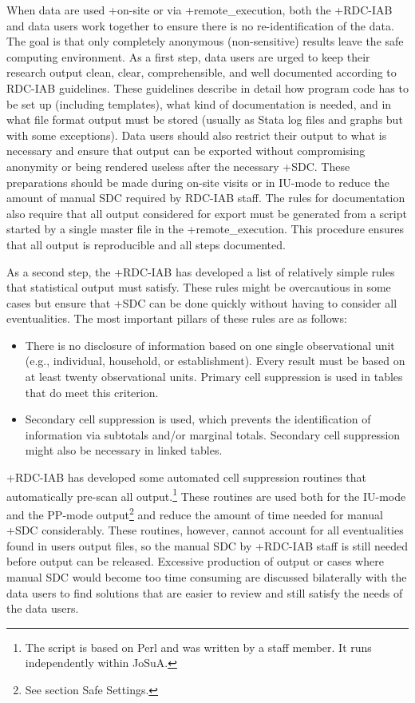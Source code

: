 \documentclass[
]{book}
\providecommand{\tightlist}{%
  \setlength{\itemsep}{0pt}\setlength{\parskip}{0pt}}
\begin{document}
When data are used +on-site\textbar{} or via +remote\_execution\textbar, both the +RDC-IAB\textbar{} and data users work together to ensure there is no re-identification of the data. The goal is that only completely anonymous (non-sensitive) results leave the safe computing environment. As a first step, data users are urged to keep their research output clean, clear, comprehensible, and well documented according to RDC-IAB guidelines. These guidelines describe in detail how program code has to be set up (including templates), what kind of documentation is needed, and in what file format output must be stored (usually as Stata log files and graphs but with some exceptions). Data users should also restrict their output to what is necessary and ensure that output can be exported without compromising anonymity or being rendered useless after the necessary +SDC\textbar. These preparations should be made during on-site visits or in IU-mode to reduce the amount of manual SDC required by RDC-IAB staff. The rules for documentation also require that all output considered for export must be generated from a script started by a single master file in the +remote\_execution\textbar. This procedure ensures that all output is reproducible and all steps documented.

As a second step, the +RDC-IAB\textbar{} has developed a list of relatively simple rules that statistical output must satisfy. These rules might be overcautious in some cases but ensure that +SDC\textbar{} can be done quickly without having to consider all eventualities. The most important pillars of these rules are as follows:

\begin{itemize}
\tightlist
\item
  There is no disclosure of information based on one single observational unit (e.g., individual, household, or establishment). Every result must be based on at least twenty observational units. Primary cell suppression is used in tables that do meet this criterion.
\item
  Secondary cell suppression is used, which prevents the identification of information via subtotals and/or marginal totals. Secondary cell suppression might also be necessary in linked tables.
\end{itemize}

+RDC-IAB\textbar{} has developed some automated cell suppression routines that automatically pre-scan all output.\footnote{The script is based on Perl and was written by a staff member. It runs independently within JoSuA.} These routines are used both for the IU-mode and the PP-mode output\footnote{See section Safe Settings.} and reduce the amount of time needed for manual +SDC\textbar{} considerably. These routines, however, cannot account for all eventualities found in users output files, so the manual SDC by +RDC-IAB\textbar{} staff is still needed before output can be released. Excessive production of output or cases where manual SDC would become too time consuming are discussed bilaterally with the data users to find solutions that are easier to review and still satisfy the needs of the data users.
\end{document}
